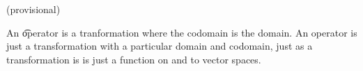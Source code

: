 

(provisional)

An \t{operator} is a tranformation where the codomain is the domain.
An operator is just a transformation with a particular domain and codomain, just as a transformation is is just a function on and to vector spaces.

\blankpage
